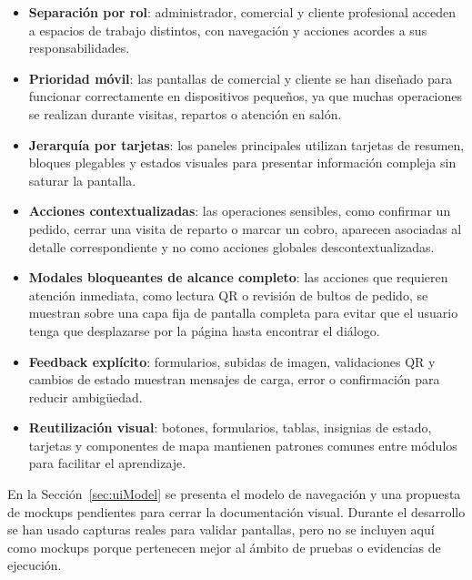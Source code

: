 \begin{itemize}
    \item \textbf{Separación por rol}: administrador, comercial y cliente profesional acceden a espacios de trabajo distintos, con navegación y acciones acordes a sus responsabilidades.
    \item \textbf{Prioridad móvil}: las pantallas de comercial y cliente se han diseñado para funcionar correctamente en dispositivos pequeños, ya que muchas operaciones se realizan durante visitas, repartos o atención en salón.
    \item \textbf{Jerarquía por tarjetas}: los paneles principales utilizan tarjetas de resumen, bloques plegables y estados visuales para presentar información compleja sin saturar la pantalla.
    \item \textbf{Acciones contextualizadas}: las operaciones sensibles, como confirmar un pedido, cerrar una visita de reparto o marcar un cobro, aparecen asociadas al detalle correspondiente y no como acciones globales descontextualizadas.
    \item \textbf{Modales bloqueantes de alcance completo}: las acciones que requieren atención inmediata, como lectura QR o revisión de bultos de pedido, se muestran sobre una capa fija de pantalla completa para evitar que el usuario tenga que desplazarse por la página hasta encontrar el diálogo.
    \item \textbf{Feedback explícito}: formularios, subidas de imagen, validaciones QR y cambios de estado muestran mensajes de carga, error o confirmación para reducir ambigüedad.
    \item \textbf{Reutilización visual}: botones, formularios, tablas, insignias de estado, tarjetas y componentes de mapa mantienen patrones comunes entre módulos para facilitar el aprendizaje.
\end{itemize}

En la Sección~\ref{sec:uiModel} se presenta el modelo de navegación y una propuesta de mockups pendientes para cerrar la documentación visual. Durante el desarrollo se han usado capturas reales para validar pantallas, pero no se incluyen aquí como mockups porque pertenecen mejor al ámbito de pruebas o evidencias de ejecución.

